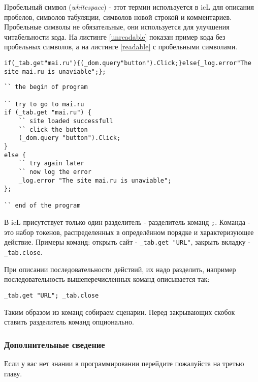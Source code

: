 \documentclass[a4paper, 14pt]{extarticle}
\begin{document}
	Пробельный символ (\textit{whitespace}) - этот термин используется в icL для описания пробелов, символов табуляции, символов новой строкой и комментариев. Пробельные символы не обязательные, они используется для улучшения читабельности кода. На листинге \ref{unreadable} показан пример кода без пробельных символов, а на листинге \ref{readable} с пробельными символами.
	
	\begin{lstlisting}[caption=Koд без пробельных символов,label=unreadable]
if(_tab.get"mai.ru"){(_dom.query"button").Click;}else{_log.error"The site mai.ru is unaviable";};
	\end{lstlisting}
	
	\begin{lstlisting}[caption=Koд с пробельных символов,label=readable]
`` the begin of program

`` try to go to mai.ru
if (_tab.get "mai.ru") {
	`` site loaded successfull
	`` click the button
	(_dom.query "button").Click;
}
else {
	`` try again later
	`` now log the error
	_log.error "The site mai.ru is unaviable";
};

`` end of the program
	\end{lstlisting}
	
	В icL присутствует только один разделитель - разделитель команд \lstinline`;`. Команда - это набор токенов, распределенных в определённом порядке и характеризующее действие. Примеры команд: открыть сайт - \lstinline`_tab.get "URL"`, закрыть вкладку - \lstinline`_tab.close`.
	
	При описании последовательности действий, их надо разделить, например последовательность вышеперечисленных команд описывается так:	
	\begin{lstlisting}[numbers=none]
_tab.get "URL"; _tab.close
	\end{lstlisting} 
	Таким образом из команд собираем сценарии. Перед закрывающих скобок ставить разделитель команд опционально.
	
	\subsubsection{Дополнительные сведение}
	
	Если у вас нет знании в программировании перейдите пожалуйста на третью главу.
	
\end{document}
